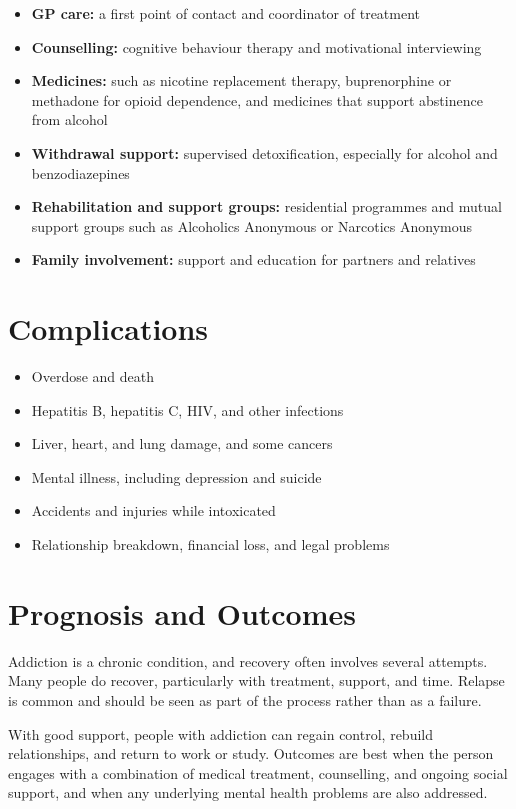 \begin{itemize}
    \item \textbf{GP care:} a first point of contact and coordinator of treatment
    \item \textbf{Counselling:} cognitive behaviour therapy and motivational interviewing
    \item \textbf{Medicines:} such as nicotine replacement therapy, buprenorphine or methadone for opioid dependence, and medicines that support abstinence from alcohol
    \item \textbf{Withdrawal support:} supervised detoxification, especially for alcohol and benzodiazepines
    \item \textbf{Rehabilitation and support groups:} residential programmes and mutual support groups such as Alcoholics Anonymous or Narcotics Anonymous
    \item \textbf{Family involvement:} support and education for partners and relatives
\end{itemize}

\section*{Complications}
\begin{itemize}
    \item Overdose and death
    \item Hepatitis B, hepatitis C, HIV, and other infections
    \item Liver, heart, and lung damage, and some cancers
    \item Mental illness, including depression and suicide
    \item Accidents and injuries while intoxicated
    \item Relationship breakdown, financial loss, and legal problems
\end{itemize}

\section*{Prognosis and Outcomes}
Addiction is a chronic condition, and recovery often involves several attempts. Many people do recover, particularly with treatment, support, and time. Relapse is common and should be seen as part of the process rather than as a failure.

With good support, people with addiction can regain control, rebuild relationships, and return to work or study. Outcomes are best when the person engages with a combination of medical treatment, counselling, and ongoing social support, and when any underlying mental health problems are also addressed.

